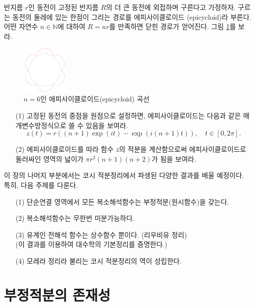 \begin{salt_exercise} \label{ex-3-22}
반지름 $r$인 동전이 고정된 반지름 $R$의  더 큰 동전에 외접하며 구른다고 가정하자.
구르는 동전의 둘레에 있는 한점이 그리는 경로를 에피사이클로이드 (epicycloid)라 부른다.
어떤 자연수 $n\in\mathbb N$에 대하여 $R=nr$를 만족하면 닫힌 경로가 얻어진다.
그림 \ref{fig-3-15}를 보라.

\begin{figure}[!h]
\begin{center}
\includegraphics[width=0.2\textwidth]{./SaltChapter/figs/fig-3-15}
\end{center}
\caption{$n=6$인 에피사이클로이드(epicycloid) 곡선}
\label{fig-3-15}
\end{figure}

\begin{itemize}
\item[(1)] 고정된 동전의 중점을 원점으로 설정하면,
에피사이클로이드는 다음과 같은 매개변수방정식으로 쓸 수 있음을 보여라.
\[
 z(t) = r((n+1)\exp(it) - \exp(i(n+1)t)), \quad t\in [0,2\pi].
\]
\item[(2)] 에피사이클로이드를 따라 함수 $\bar z$의 적분을 계산함으로써
에피사이클로이드로 둘러싸인 영역의 넓이가 $\pi r^2(n+1)(n+2)$가 됨을 보여라.
\end{itemize}
\end{salt_exercise}

이 장의 나머지 부분에서는
코시 적분정리에서 파생된 다양한 결과를 배울 예정이다.
특히, 다음 주제를 다룬다.

\begin{itemize}
\item[(1)] 단순연결 영역에서 모든 복소해석함수는 부정적분(원시함수)을 갖는다.
\item[(2)] 복소해석함수는 무한번 미분가능하다.
\item[(3)] 유계인 전해석 함수는 상수함수 뿐이다. (리우비유 정리)  \\
(이 결과를 이용하여 대수학의 기본정리를 증명한다.)
\item[(4)] 모레라 정리라 불리는 코시 적분정리의 역이 성립한다.
\end{itemize}

\section{부정적분의 존재성}

